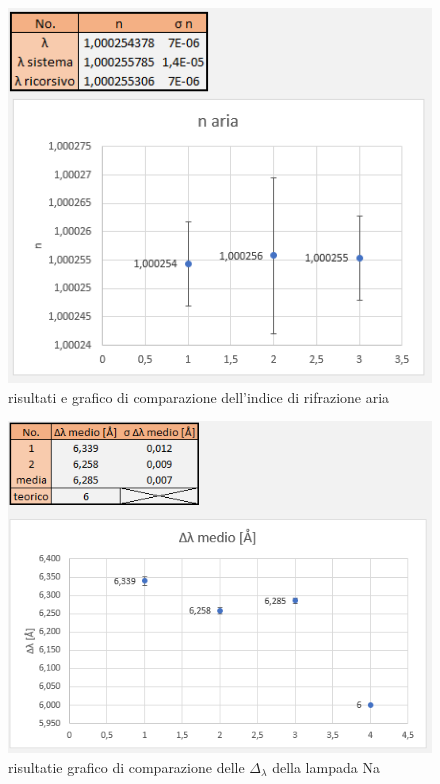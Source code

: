 \documentclass{article}
\begin{document}
\begin{figure}[h!]
  \centering
  \includegraphics[width=0.6\linewidth]{IM comparazione n}
  \caption{risultati e grafico di comparazione dell'indice di rifrazione aria}
\end{figure}

\begin{figure}[h!]
  \centering
  \includegraphics[width=0.6\linewidth]{IM comparazione delta lambda}
  \caption{risultatie grafico di comparazione delle $\Delta_\lambda$ della lampada Na}
\end{figure}
\end{document}
